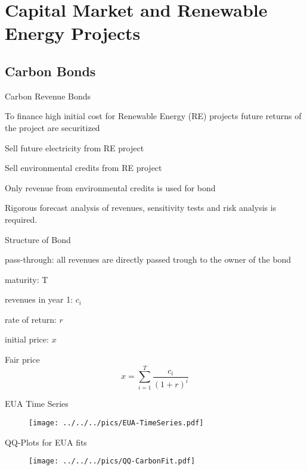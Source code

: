 \section{Capital Market and Renewable Energy Projects}
\subsection{Carbon Bonds}

{Carbon Revenue Bonds}


	To finance high initial cost for Renewable Energy (RE) projects future returns of the project are securitized


	Sell future electricity from RE project

	Sell environmental credits from RE project


	Only revenue from environmental credits is used for bond

	Rigorous forecast analysis of revenues, sensitivity tests and risk analysis is required.


{Structure of Bond}


	pass-through: all revenues are directly passed trough to the owner of the bond


	maturity: T

	revenues in year 1: $c_i$

	rate of return: $r$

	initial price: $x$


	Fair price
$$
x= \sum_{i=1}^T \frac{c_i}{(1+r)^i}
$$


{EUA Time Series}
\begin{figure}[h!]
\centering
\texttt{[image: ../../../pics/EUA-TimeSeries.pdf]}
\label{fig:EUA-TS}
\end{figure}

{QQ-Plots for EUA fits}
\begin{figure}[h!]
\centering
\texttt{[image: ../../../pics/QQ-CarbonFit.pdf]}
\label{fig:EUA-fits}
\end{figure}

